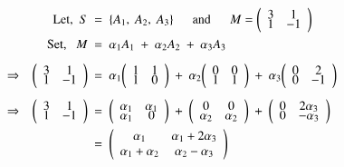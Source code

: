\documentclass[12pt]{article}
\renewenvironment{pmatrix}
{\left(\begin{array}{ccc}}
{\end{array}\right)}
\begin{document}
\vspace{3ex}
\vspace{-2\baselineskip}
\begin{align*}
   \text{Let, \ } S \ &=\ \{A_1, \ A_2, \ A_3\} \tabs \text{and} \tabs M=\begin{pmatrix} 3 & 1 \\[-1ex] 1 & -1 \end{pmatrix}\\
   \text{Set, \ \ } M \ &=\ \alpha_1 A_1 \ +\ \alpha_2 A_2 \ +\ \alpha_3 A_3\\[1ex]
   \Rightarrow \tab
   \begin{pmatrix} 3 & 1 \\[-1ex] 1 & -1 \end{pmatrix}
      \ &=\ \alpha_1
   \begin{pmatrix} 1 & 1 \\[-1ex] 1 & 0 \end{pmatrix}
      \ +\ \alpha_2 
   \begin{pmatrix} 0 & 0 \\[-1ex] 1 & 1 \end{pmatrix}
      \ +\ \alpha_3 
   \begin{pmatrix} 0 & 2 \\[-1ex] 0 & -1 \end{pmatrix}\\[1ex]
      \Rightarrow \tab
   \begin{pmatrix} 3 & 1 \\[-1ex] 1 & -1 \end{pmatrix} \ &=\ \begin{pmatrix}
      \alpha_1 & \alpha_1 \\[-1ex] \alpha_1 & 0
   \end{pmatrix} \ +\ \begin{pmatrix}
     0 & 0 \\[-1ex] \alpha_2 & \alpha_2
   \end{pmatrix} \ +\ \begin{pmatrix}
      0 & 2\alpha_3 \\[-1ex] 0 & -\alpha_3
   \end{pmatrix} \\
   \ &=\
   \begin{pmatrix}
      \alpha_1 & \alpha_1+2 \alpha_3 \\
      \alpha_1+\alpha_2 & \alpha_2-\alpha_3
   \end{pmatrix} 
\end{align*}
\end{document}
